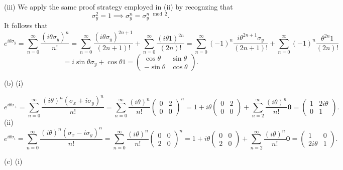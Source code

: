 \documentclass[11pt, letterpaper]{article}
\begin{document}
(iii) We apply the same proof strategy employed in (ii) by recognzing that
\[
	\sigma _y^2 = 1 \implies \sigma _y^{n} =\sigma _y^{n\mod 2} 
.\]
It follows that
\[
	e^{i\theta \sigma _y} =\sum_{n=0}^{\infty} \frac{(i\theta \sigma _y)^n}{n!} =\sum_{n=0}^{\infty} \frac{(i\theta \sigma _y)^{2n+1} }{(2n+1)!} +\sum_{n=0}^{\infty} \frac{(i\theta 1)^{2n} }{(2n)!} =\sum_{n=0}^{\infty} (-1)^{n} \frac{i\theta ^{2n+1} \sigma _y}{(2n+1)!} +\sum_{n=0}^{\infty} (-1)^{n} \frac{\theta ^{2n} 1}{(2n)!} 
\]
\[
	=i\sin \theta \sigma _y + \cos \theta 1 = \begin{pmatrix}
	\cos \theta  & \sin \theta  \\
	-\sin \theta  & \cos \theta 
	\end{pmatrix}
.\]

(b) (i)

\[
	e^{i\theta \sigma _+} =\sum_{n=0}^{\infty} \frac{(i\theta )^n( \sigma _x+i\sigma _y)^n}{n!} =\sum_{n=0}^{\infty} \frac{(i\theta )^n}{n!} \begin{pmatrix}
	0 & 2 \\
	0 & 0
	\end{pmatrix}^n=1+i\theta \begin{pmatrix}
	0 & 2 \\
	0 & 0
	\end{pmatrix}+\sum_{n=2}^{\infty} \frac{(i\theta )^n}{n!} \mathbf{0} =\begin{pmatrix}
	1 & 2i\theta  \\
	0 & 1
	\end{pmatrix}
.\]
(ii)
\[
	e^{i\theta \sigma _i} =\sum_{n=0}^{\infty} \frac{(i\theta )^n\left( \sigma _x-i\sigma _y \right)^n }{n!} =\sum_{n=0}^{\infty} \frac{(i\theta )^n}{n!} \begin{pmatrix}
	0 & 0 \\
	2 & 0
	\end{pmatrix}^n=1+i\theta \begin{pmatrix}
	0 & 0 \\
	2 & 0
	\end{pmatrix}+\sum_{n=2}^{\infty} \frac{(i\theta )^n}{n!} \mathbf{0} =\begin{pmatrix}
	1 & 0 \\
	2i\theta  & 1
	\end{pmatrix}
.\]


(c) (i)
\end{document}
